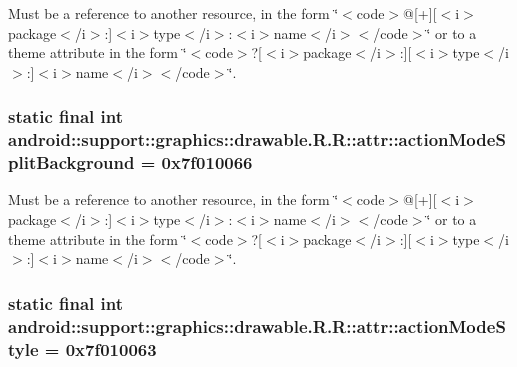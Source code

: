 Must be a reference to another resource, in the form \char`\"{}$<$code$>$@\mbox{[}+\mbox{]}\mbox{[}$<$i$>$package$<$/i$>$:\mbox{]}$<$i$>$type$<$/i$>$:$<$i$>$name$<$/i$>$$<$/code$>$\char`\"{} or to a theme attribute in the form \char`\"{}$<$code$>$?\mbox{[}$<$i$>$package$<$/i$>$:\mbox{]}\mbox{[}$<$i$>$type$<$/i$>$:\mbox{]}$<$i$>$name$<$/i$>$$<$/code$>$\char`\"{}. \hypertarget{classandroid_1_1support_1_1graphics_1_1drawable_1_1_r_1_1attr_d1ccc6fdb8f0fdcbcdf5ecce9be60509}{
\subsubsection[{actionModeSplitBackground}]{\setlength{\rightskip}{0pt plus 5cm}static final int android::support::graphics::drawable.R.R::attr::actionModeSplitBackground = 0x7f010066}}
\label{classandroid_1_1support_1_1graphics_1_1drawable_1_1_r_1_1attr_d1ccc6fdb8f0fdcbcdf5ecce9be60509}


Must be a reference to another resource, in the form \char`\"{}$<$code$>$@\mbox{[}+\mbox{]}\mbox{[}$<$i$>$package$<$/i$>$:\mbox{]}$<$i$>$type$<$/i$>$:$<$i$>$name$<$/i$>$$<$/code$>$\char`\"{} or to a theme attribute in the form \char`\"{}$<$code$>$?\mbox{[}$<$i$>$package$<$/i$>$:\mbox{]}\mbox{[}$<$i$>$type$<$/i$>$:\mbox{]}$<$i$>$name$<$/i$>$$<$/code$>$\char`\"{}. \hypertarget{classandroid_1_1support_1_1graphics_1_1drawable_1_1_r_1_1attr_6025acc3631f491a122c24ad2245c047}{
\subsubsection[{actionModeStyle}]{\setlength{\rightskip}{0pt plus 5cm}static final int android::support::graphics::drawable.R.R::attr::actionModeStyle = 0x7f010063}}
\label{classandroid_1_1support_1_1graphics_1_1drawable_1_1_r_1_1attr_6025acc3631f491a122c24ad2245c047}


